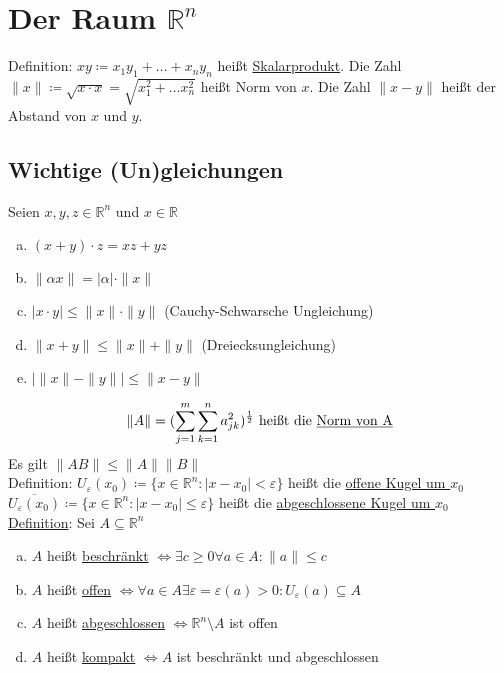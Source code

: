 \documentclass{article}
\begin{document}
\section{Der Raum $\mathbb{R}^n$}
Definition: $xy \coloneqq x_1y_1 + \ldots + x_ny_n$ heißt \underline{Skalarprodukt}. Die Zahl $\| x \| \coloneqq \sqrt{x\cdot x} = \sqrt{x_1^2 + \ldots x_n^2}$
heißt Norm von $x$. Die Zahl $\| x-y\|$ heißt der Abstand von $x$ und $y$.

\subsection{Wichtige (Un)gleichungen}
Seien $x,y,z \in \mathbb{R}^n$ und $x \in \mathbb{R}$
\begin{enumerate} [a)]
    \item $(x+y) \cdot z = xz + yz$
    \item $\| \alpha x \| = |\alpha| \cdot \| x\|$
    \item $|x\cdot y| \leq \| x\| \cdot \| y\|$ (Cauchy-Schwarsche Ungleichung)
    \item $\|x+y\| \leq  \|x\| + \| y\|$ (Dreiecksungleichung)
    \item $|\| x \| - \| y \|| \leq \| x-y \|$
\end{enumerate}
\begin{align*}
    \|A\| = (\sum \limits_{j=1}^{m} \sum \limits_{k=1}^{n} a_{jk}^2)^{\frac{1}{2}} \text{ heißt die \underline{Norm von A}}
\end{align*}
Es gilt $\| AB\| \leq \| A \| \| B \|$ \\
Definition: $U_\varepsilon (x_0) \coloneqq \{x \in \mathbb{R}^n: |x-x_0| < \varepsilon \}$ heißt die \underline{offene Kugel um $x_0$} \\
$\overline{U_\varepsilon(x_0)} \coloneqq \{ x \in \mathbb{R}^n: |x-x_0| \leq \varepsilon\}$ heißt die \underline{abgeschlossene Kugel um $x_0$} \\

\underline{Definition}: Sei $A \subseteq \mathbb{R}^n$
\begin{enumerate} [a)]
    \item $A$ heißt \underline{beschränkt} $\Leftrightarrow \exists c \geq 0 \forall a \in A: \| a \| \leq c$
    \item $A$ heißt \underline{offen} $\Leftrightarrow \forall a \in A \exists \varepsilon = \varepsilon(a) > 0: U_\varepsilon(a) \subseteq A$ 
    \item $A$ heißt \underline{abgeschlossen} $\Leftrightarrow \mathbb{R}^n \setminus A$ ist offen
    \item $A$ heißt \underline{kompakt} $\Leftrightarrow A$ ist beschränkt und abgeschlossen 
\end{enumerate}
\end{document}
